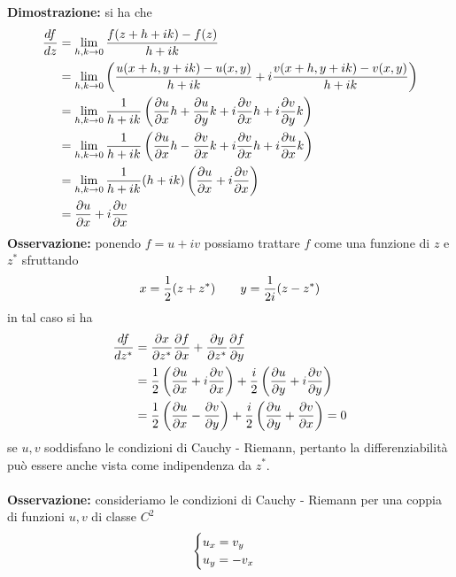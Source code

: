 \documentclass{article}
\begin{document}
\textbf{Dimostrazione:} si ha che
\begin{align}
    \frac{df}{dz} &= \lim_{h, k \rightarrow 0}\frac{f(z + h + ik) - f(z)}{h + ik} \notag \\
    &= \lim_{h, k \rightarrow 0}\left(\frac{u(x + h, y + ik) - u(x, y)}{h + ik} + i\frac{v(x + h, y + ik) - v(x, y)}{h + ik}\right) \notag \\
    &= \lim_{h, k \rightarrow 0}\frac{1}{h + ik}\left(\frac{\partial u}{\partial x}h + \frac{\partial u}{\partial y}k + i\frac{\partial v}{\partial x}h + i\frac{\partial v}{\partial y}k\right) \notag \\
    &= \lim_{h, k \rightarrow 0}\frac{1}{h + ik}\left(\frac{\partial u}{\partial x}h - \frac{\partial v}{\partial x}k + i\frac{\partial v}{\partial x}h + i\frac{\partial u}{\partial x}k\right) \notag \\
    &= \lim_{h, k \rightarrow 0}\frac{1}{h + ik}(h + ik)\left(\frac{\partial u}{\partial x} + i\frac{\partial v}{\partial x}\right) \notag \\
    &= \frac{\partial u}{\partial x} + i\frac{\partial v}{\partial x} \notag
\end{align}
\textbf{Osservazione:} ponendo $f = u + iv$ possiamo trattare $f$ come una funzione di $z$ e $z^*$ sfruttando
\begin{gather}
    x = \frac{1}{2}(z + z^*) \qquad y = \frac{1}{2i}(z - z^*) \notag
\end{gather}
in tal caso si ha
\begin{align}
    \frac{df}{dz^*} &= \frac{\partial x}{\partial z^*}\frac{\partial f}{\partial x} + \frac{\partial y}{\partial z^*}\frac{\partial f}{\partial y} \notag \\
    &= \frac{1}{2}\left(\frac{\partial u}{\partial x} + i\frac{\partial v}{\partial x}\right) + \frac{i}{2}\left(\frac{\partial u}{\partial y} + i\frac{\partial v}{\partial y}\right) \notag \\
    &= \frac{1}{2}\left(\frac{\partial u}{\partial x} - \frac{\partial v}{\partial y}\right) + \frac{i}{2}\left(\frac{\partial u}{\partial y} + \frac{\partial v}{\partial x}\right) = 0 \notag
\end{align}
se $u, v$ soddisfano le condizioni di Cauchy - Riemann, pertanto la differenziabilità può essere anche vista come indipendenza da $z^*$. \\ \\
\textbf{Osservazione:} consideriamo le condizioni di Cauchy - Riemann per una coppia di funzioni $u, v$ di classe $C^2$
\begin{gather}
    \begin{cases}
        u_x = v_y \\
        u_y = -v_x
    \end{cases} \notag
\end{gather}
\end{document}
